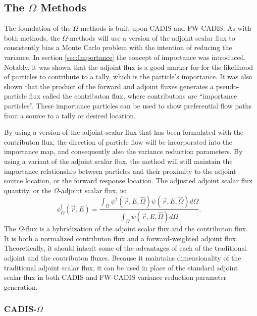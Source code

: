 \subsection{The $\Omega$ Methods}
\label{sec:omegaintro}

The foundation of the $\Omega$-methods is built upon CADIS and FW-CADIS. As with
both methods,
the $\Omega$-methods will use a version of the adjoint scalar flux to
consistently bias a Monte Carlo problem with the intention of reducing the
variance. In section \ref{sec:Importance} the concept of importance was
introduced. Notably, it was shown that the adjoint flux is a good marker for
for the likelihood of particles to contribute to a tally, which is the
particle's importance. It was also shown that the
product of the forward and adjoint fluxes generates a pseudo-particle flux called
the contributon flux, where contributons are ``importance particles''.
These importance particles can be used to show preferential flow paths from a
source to a tally or desired location.

By using a version of the adjoint scalar flux that has been formulated with the
contributon flux, the direction of particle flow will be incorporated into the
importance map, and consequently also the
variance reduction parameters. By using a variant of the adjoint scalar flux,
the method will still maintain the importance relationship between particles and
their proximity to the adjoint source location, or the forward response
location. The adjusted adjoint scalar flux quantity, or the $\Omega$-adjoint
scalar flux, is:
%
\begin{equation}
  \phi^{\dagger}_{\Omega}(\vec {r} ,E)  = \frac{\int_{\Omega}{\psi^{\dagger}
                             (\vec{r}, E, \hat\Omega)
                             \psi(\vec{r}, E, \hat\Omega)} d\Omega}
                             {\int_{\Omega}\psi(\vec{r}, E, \hat\Omega)
                           d\Omega}.
\label{eq:omega_basic}
\end{equation}
%
The $\Omega$-flux is a hybridization of the adjoint scalar flux and the contributon
flux. It is both a normalized contributon flux and a forward-weighted
adjoint flux. Theoretically, it should inherit some of the advantages of
each of the traditional
adjoint and the contributon fluxes. Because it maintains dimensionality of the
traditional adjoint scalar flux, it can be used in place of the standard adjoint
scalar flux in both
CADIS and FW-CADIS variance reduction parameter generation.

\subsubsection{CADIS-$\Omega$}
\label{sec:cadomega}

